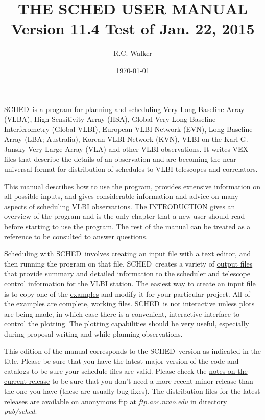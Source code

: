 \documentclass{report}
\newcommand{\schedb}{{\sc SCHED~}}
\begin{document}
\title{THE {{\sc SCHED}} USER MANUAL \\ Version 11.4 Test of Jan. 22, 2015}
\author{R.C. Walker}
\date{\today}
\maketitle


\schedb is a program for planning and scheduling Very Long Baseline
Array (VLBA), High Sensitivity Array (HSA), Global Very Long Baseline
Interferometry (Global VLBI), European VLBI Network (EVN), Long
Baseline Array (LBA; Australia), Korean VLBI Network (KVN), VLBI on
the Karl G. Jansky Very Large Array (VLA) and other VLBI observations.
It writes VEX files that describe the details of an observation and
are becoming the near universal format for distribution of schedules
to VLBI telescopes and correlators.

This manual describes how to use the program, provides extensive
information on all possible inputs, and gives considerable information
and advice on many aspects of scheduling VLBI observations.  The
{\hyperref[CHP:INTRO]{INTRODUCTION}} gives an overview of the program and
is the only chapter that a new user should read before starting to use
the program.  The rest of the manual can be treated as a reference to
be consulted to answer questions.

Scheduling with \schedb involves creating an input file with a text
editor, and then running the program on that file.  \schedb creates a
variety of 
{\hyperref[SEC:FILES]{output files}} that provide summary and
detailed information to the scheduler and telescope control
information for the VLBI station.  The easiest way to create an input
file is to copy one of the 
{\hyperref[SEC:EXAMPLES]{examples}} and
modify it for your particular project.  All of the examples are
complete, working files.  \schedb is not interactive unless
{\hyperref[SEC:PLOT]{plots}} are being made, in which case there is a
convenient, interactive interface to control the plotting.  The
plotting capabilities should be very useful, especially during
proposal writing and while planning observations.

This edition of the manual corresponds to the \schedb version as
indicated in the title.  Please be sure that you have the latest major
version of the code and catalogs to be sure your schedule files are
valid.  Please check the 
{\hyperref[SEC:CURRENT]{notes on the current release}}
to be sure that you don't need a more recent
minor release than the one you have (these are usually bug fixes).
The distribution files for the latest releases are available on
anonymous ftp at 
{\href{ftp://ftp.aoc.nrao.edu/pub/sched}{{\sl ftp.aoc.nrao.edu}}} in directory {\sl pub/sched}.
\end{document}
